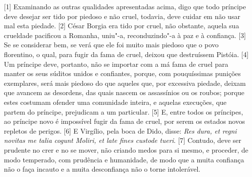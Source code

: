 {[}1{]} Examinando as outras qualidades apresentadas acima, digo que
todo príncipe deve desejar ser tido por piedoso e não cruel, todavia,
deve cuidar em não usar mal esta piedade. {[}2{]} César Borgia era tido
por cruel, não obstante, aquela sua crueldade pacificou a Romanha,
uniu"-a, reconduzindo"-a à paz e à confiança. {[}3{]} Se se considerar
bem, se verá que ele foi muito mais piedoso que o povo florentino, o
qual, para fugir da fama de cruel, deixou que destruíssem
Pistóia. {[}4{]} Um príncipe deve, portanto, não se
importar com a má fama de cruel para manter os seus súditos unidos e
confiantes, porque, com pouquíssimas punições exemplares, será mais
piedoso do que aqueles que, por excessiva piedade, deixam que avancem as
desordens, das quais nascem os assassínios ou os roubos; porque estes
costumam ofender uma comunidade inteira, e aquelas execuções, que partem
do príncipe, prejudicam a um particular. {[}5{]} E, entre todos os
príncipes, ao príncipe novo é impossível fugir da fama de cruel, por
serem os estados novos repletos de perigos. {[}6{]} E Virgílio, pela
boca de Dido, disse: \emph{Res dura, et regni novitas me talia cogunt
Moliri, et late fines custode tueri}. {[}7{]}
Contudo, deve ser prudente no crer e no se mover, não criando medos para
si mesmo, e proceder, de modo temperado, com prudência e humanidade, de
modo que a muita confiança não o faça incauto e a muita desconfiança não
o torne intolerável.

